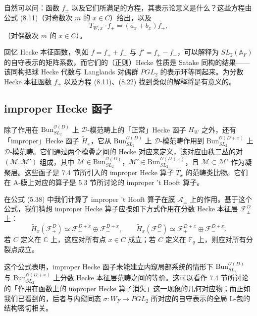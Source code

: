 \documentclass[11pt,a4paper]{article}
\newcommand{\Bun}{\mathrm{Bun}}
\newcommand{\CD}{\mathcal{D}}
\begin{document}
自然可以问：函数 $f_\pm$ 以及它们所满足的方程，其表示论意义是什么？这些方程由公式 (8.11)（对奇数次 $m$ 的 $x\in C$）给出，以及
\begin{equation}\tag{8.22}
T_{W,x}\cdot f_\pm = (a_x + b_x)f_\pm,
\end{equation}
（对偶数次 $m$ 的 $x\in C$）。

回忆 Hecke 本征函数，例如 $f = f_+ + f_-$ 与 $f' = f_+ - f_-$，可以解释为 $SL_2(\mathbb{A}_F)$ 的自守表示的矩阵系数，而它们的（正则）Hecke 性质是 Satake 同构的结果——该同构把球 Hecke 代数与 Langlands 对偶群 $PGL_2$ 的表示环等同起来。为分数 Hecke 本征函数 $f_\pm$ 以及方程 (8.11)、(8.22) 找到类似的解释将是有意义的。


\subsection{improper Hecke 函子}

除了作用在 $\Bun^{\mathcal{O}(D)}_{SL_2}$ 上 $\CD$-模范畴上的「正常」Hecke 函子 $H_W$ 之外，还有「improper」Hecke 函子 $\tilde{H}_x$，它从 $\Bun^{\mathcal{O}(D)}_{SL_2}$ 上 $\CD$-模范畴作用到 $\Bun^{\mathcal{O}(D+x)}_{SL_2}$ 上 $\CD$-模范畴。它们通过两个模叠之间的 Hecke 对应来定义，该对应由秩二丛的对 $(\mathcal{M}, \mathcal{M}')$ 组成，其中 $\mathcal{M}\in \Bun^{\mathcal{O}(D)}_{SL_2}$，$\mathcal{M}'\in \Bun^{\mathcal{O}(D+x)}_{SL_2}$，且 $\mathcal{M}\subset \mathcal{M}'$ 作为凝聚层。这些函子是 7.4 节所引入的 improper Hecke 算子 $\tilde{T}_x$ 的范畴类比物。它们在 A-膜上对应的算子是 5.3 节所讨论的 improper 't Hooft 算子。

在公式 (5.38) 中我们计算了 improper 't Hooft 算子在膜 $\mathcal{A}_\pm$ 上的作用。基于这个公式，我们猜想 improper Hecke 算子应按如下方式作用在分数 Hecke 本征层 $\mathcal{F}^D_\pm$ 上：
\[
\tilde{H}_x(\mathcal{F}^D_+) \simeq \mathcal{F}^{D+x}_+ \oplus \mathcal{F}^{D+x}_-,\qquad
\tilde{H}_x(\mathcal{F}^D_-) \simeq \mathcal{F}^{D+x}_+ \oplus \mathcal{F}^{D+x}_-.
\]
若 $C$ 定义在 $\mathbb{C}$ 上，这应对所有点 $x\in C$ 成立；若 $C$ 定义在 $\mathbb{F}_q$ 上，则应对所有分裂点成立。


这个公式表明，improper Hecke 函子未能建立内窥局部系统的情形下 $\Bun^{\mathcal{O}(D)}_{SL_2}$ 与 $\Bun^{\mathcal{O}(D+x)}_{SL_2}$ 上分数 Hecke 本征层范畴之间的等价。这可以看作 7.4 节所讨论的「作用在函数上的 improper Hecke 算子消失」这一现象的几何对应物；而正如我们已看到的，后者与内窥同态 $\sigma : W_F \to PGL_2$ 所对应的自守表示的全局 L-包的结构密切相关。
\end{document}
